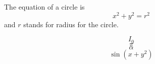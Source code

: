 \documentclass[12pt]{article}
\begin{document}
The equation of a circle is $$x^2 + y^2 = r^2$$ and $r$ stands for radius for the circle.

$$I_0$$
$$\pi$$
$$\alpha$$
$$\sin(x + y^2)$$
\end{document}
